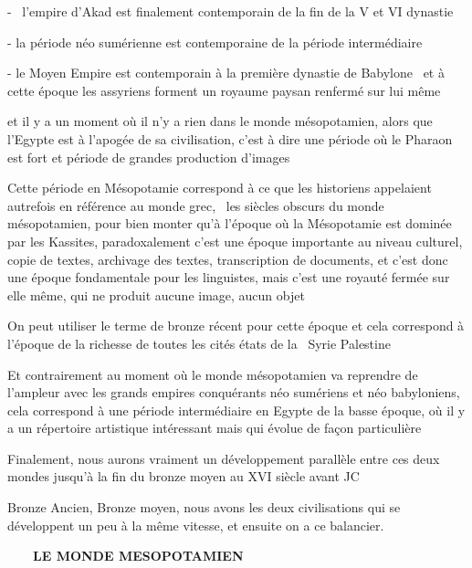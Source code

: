 \documentclass[a4paper]{article}
\begin{document}
{
{}- \ l'empire d'Akad est finalement contemporain de la fin de la V et
VI dynastie}

{
{}- la période néo sumérienne est contemporaine de la période
intermédiaire}

{
{}- le Moyen Empire est contemporain à la première dynastie de Babylone
\ et à cette époque les assyriens forment un royaume paysan renfermé
sur lui même}

{
et il y a un moment où il n'y a rien dans le monde mésopotamien, alors
que l'Egypte est à l'apogée de sa civilisation, c'est à dire une
période où le Pharaon est fort et période de grandes production
d'images}

{
Cette période en Mésopotamie correspond à ce que les historiens
appelaient autrefois en référence au monde grec, \ les siècles obscurs
du monde mésopotamien, pour bien monter qu'à l'époque où la Mésopotamie
est dominée par les Kassites, paradoxalement c'est une époque
importante au niveau culturel, copie de textes, archivage des textes,
transcription de documents, et c'est donc une époque fondamentale pour
les linguistes, mais c'est une royauté fermée sur elle même, qui ne
produit aucune image, aucun objet}


\bigskip

{
On peut utiliser le terme de bronze récent pour cette époque et cela
correspond à l'époque de la richesse de toutes les cités états de la
\ Syrie Palestine}


\bigskip

{
Et contrairement au moment où le monde mésopotamien va reprendre de
l'ampleur avec les grands empires conquérants néo sumériens et néo
babyloniens, cela correspond à une période intermédiaire en Egypte de
la basse époque, où il y a un répertoire artistique intéressant mais
qui évolue de façon particulière}

{
Finalement, nous aurons vraiment un développement parallèle entre ces
deux mondes jusqu'à la fin du bronze moyen au XVI siècle avant JC}

{
Bronze Ancien, Bronze moyen, nous avons les deux civilisations qui se
développent un peu à la même vitesse, et ensuite on a ce balancier.}


\bigskip


\bigskip

{
\ \ \ \ \textbf{LE MONDE MESOPOTAMIEN}}
\end{document}
